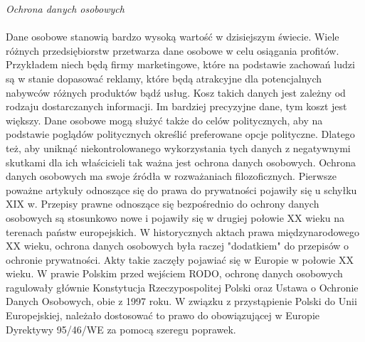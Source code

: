 \documentclass[en, noamssymb]{mgr}
\begin{document}
\indent \textit{Ochrona danych osobowych} \\ \\
\indent Dane osobowe stanowią bardzo wysoką wartość w dzisiejszym świecie.
Wiele różnych przedsiębiorstw przetwarza dane osobowe w celu osiągania profitów. Przykładem niech będą firmy marketingowe, które na podstawie zachowań ludzi są w stanie dopasować reklamy, które będą atrakcyjne dla potencjalnych nabywców różnych produktów bądź usług. Kosz takich danych jest zależny od rodzaju dostarczanych informacji. Im bardziej precyzyjne dane, tym koszt jest większy. Dane osobowe mogą służyć także do celów politycznych, aby na podstawie poglądów politycznych określić preferowane opcje polityczne. Dlatego też, aby uniknąć niekontrolowanego wykorzystania tych danych z negatywnymi skutkami dla ich właścicieli tak ważna jest ochrona danych osobowych.
\indent Ochrona danych osobowych ma swoje źródła w rozważaniach filozoficznych. Pierwsze poważne artykuły odnoszące się do prawa do prywatności pojawiły się u schyłku XIX w. Przepisy prawne odnoszące się bezpośrednio do ochrony danych osobowych są stosunkowo nowe i pojawiły się w drugiej połowie XX wieku na terenach państw europejskich. W historycznych aktach prawa międzynarodowego XX wieku, ochrona danych osobowych była raczej "dodatkiem" do przepisów o ochronie prywatności. Akty takie zaczęły pojawiać się w Europie w połowie XX wieku.
\indent W prawie Polskim przed wejściem RODO, ochronę danych osobowych ragulowały głównie Konstytucja Rzeczypospolitej Polski oraz Ustawa o Ochronie Danych Osobowych, obie z 1997 roku. W związku z przystąpienie Polski do Unii Europejskiej, należało dostosować to prawo do obowiązującej w Europie Dyrektywy 95/46/WE za pomocą szeregu poprawek.\\ \\
\end{document}
